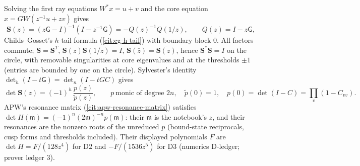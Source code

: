 \begin{theorem}
\label{thm:multi-exit-scattering}
Solving the first ray equations $W^{*}x = u+v$ and the core equation $x = GW(z^{-1}u+zv)$ gives
\[
\mathbf S(z) = (z\mathsf G-I)^{-1}(I-z^{-1}\mathsf G) = -Q(z)^{-1}Q(1/z),\qquad Q(z) = I-z\mathsf G ,
\]
Childs--Gosset's $h$-tail formula (\cref{cit:cg-h-tail}) with boundary block $0$. All factors commute;
$\mathbf S = \mathbf S^{T}$, $\mathbf S(z)\mathbf S(1/z) = I$, $\mathbf S(\bar z) = \overline{\mathbf S(z)}$, hence
$\mathbf S^{*}\mathbf S = I$ on the circle, with removable singularities at core eigenvalues and at the thresholds
$\pm1$ (entries are bounded by one on the circle). Sylvester's identity $\det_h(I-t\mathsf G) = \det_n(I-tGC)$
gives
\[
\det\mathbf S(z) = (-1)^h\,\frac{p(z)}{\tilde p(z)} ,\qquad p\ \text{monic of degree }2n,\quad
\tilde p(0) = 1,\quad p(0) = \det(I-C) = \prod_v(1-C_{vv}).
\]
APW's resonance matrix (\cref{cit:apw-resonance-matrix}) satisfies $\det H(\mathfrak m) = (-1)^n(2\mathfrak m)^{-n}p(\mathfrak m)$:
their $\mathfrak m$ is the notebook's $z$, and their resonances are the nonzero roots of the unreduced $p$
(bound-state reciprocals, cusp forms and thresholds included). Their displayed polynomials $F$ are
$\det H = F/(128z^4)$ for $\mathrm{D2}$ and $-F/(1536z^5)$ for $\mathrm{D3}$ (numerics D-ledger; prover ledger 3).
\end{theorem}

